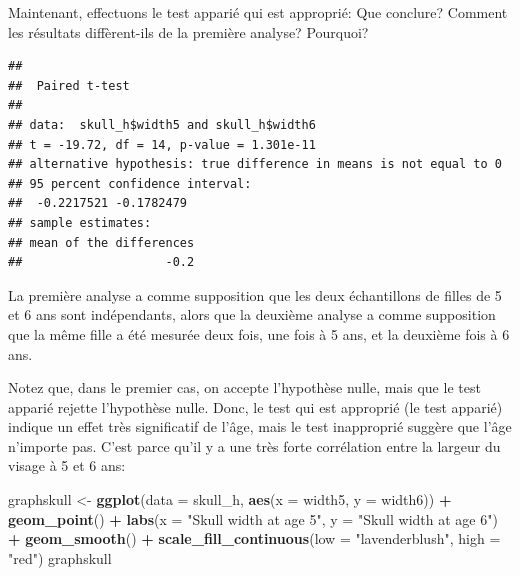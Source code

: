 \documentclass[
  12pt,
]{book}
\newenvironment{Shaded}{\begin{snugshade}}{\end{snugshade}}
\newcommand{\DataTypeTok}[1]{\textcolor[rgb]{0.13,0.29,0.53}{#1}}
\newcommand{\KeywordTok}[1]{\textcolor[rgb]{0.13,0.29,0.53}{\textbf{#1}}}
\newcommand{\NormalTok}[1]{#1}
\newcommand{\OperatorTok}[1]{\textcolor[rgb]{0.81,0.36,0.00}{\textbf{#1}}}
\newcommand{\OtherTok}[1]{\textcolor[rgb]{0.56,0.35,0.01}{#1}}
\newcommand{\StringTok}[1]{\textcolor[rgb]{0.31,0.60,0.02}{#1}}
\begin{document}
Maintenant, effectuons le test apparié qui est approprié: Que conclure? Comment les résultats diffèrent-ils de la première analyse? Pourquoi?

\begin{Shaded}
\end{Shaded}

\begin{verbatim}
## 
##  Paired t-test
## 
## data:  skull_h$width5 and skull_h$width6
## t = -19.72, df = 14, p-value = 1.301e-11
## alternative hypothesis: true difference in means is not equal to 0
## 95 percent confidence interval:
##  -0.2217521 -0.1782479
## sample estimates:
## mean of the differences 
##                    -0.2
\end{verbatim}

La première analyse a comme supposition que les deux échantillons de filles de 5 et 6 ans sont indépendants, alors que la deuxième analyse a comme supposition que la même fille a été mesurée deux fois, une fois à 5 ans, et la deuxième fois à 6 ans.

Notez que, dans le premier cas, on accepte l'hypothèse nulle, mais que le test apparié rejette l'hypothèse nulle. Donc, le test qui est approprié (le test apparié) indique un effet très significatif de l'âge, mais le test inapproprié suggère que l'âge n'importe pas. C'est parce qu'il y a une très forte corrélation entre la largeur du visage à 5 et 6 ans:

\begin{Shaded}
\begin{Highlighting}[]
\NormalTok{graphskull \textless{}{-}}\StringTok{ }\KeywordTok{ggplot}\NormalTok{(}\DataTypeTok{data =}\NormalTok{ skull\_h, }\KeywordTok{aes}\NormalTok{(}\DataTypeTok{x =}\NormalTok{ width5, }\DataTypeTok{y =}\NormalTok{ width6)) }\OperatorTok{+}
\StringTok{  }\KeywordTok{geom\_point}\NormalTok{() }\OperatorTok{+}
\StringTok{  }\KeywordTok{labs}\NormalTok{(}\DataTypeTok{x =} \StringTok{"Skull width at age 5"}\NormalTok{, }\DataTypeTok{y =} \StringTok{"Skull width at age 6"}\NormalTok{) }\OperatorTok{+}
\StringTok{  }\KeywordTok{geom\_smooth}\NormalTok{() }\OperatorTok{+}
\StringTok{  }\KeywordTok{scale\_fill\_continuous}\NormalTok{(}\DataTypeTok{low =} \StringTok{"lavenderblush"}\NormalTok{, }\DataTypeTok{high =} \StringTok{"red"}\NormalTok{)}
\NormalTok{graphskull}
\end{Highlighting}
\end{Shaded}
\end{document}
